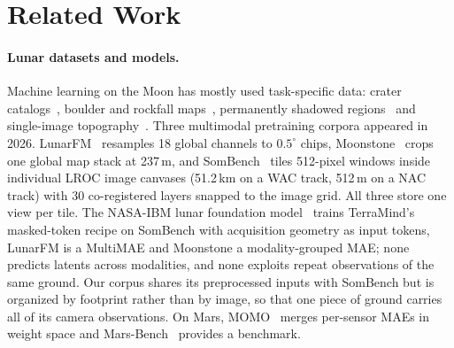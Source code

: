\section{Related Work}
\label{sec:related}

\paragraph{Lunar datasets and models.} Machine learning on the Moon has mostly used task-specific data: crater catalogs~\cite{robbins2019new,silburt2019lunar,yang2020lunar,tewari2022automated}, boulder and rockfall maps~\cite{bickel2019automated,bickel2020impacts,aussel2025global}, permanently shadowed regions~\cite{bickel2021peering} and single-image topography~\cite{chen2022cnn,sander2026moon}. Three multimodal pretraining corpora appeared in 2026. LunarFM~\cite{gironamata2026lunarfm} resamples 18 global channels to $0.5^\circ$ chips, Moonstone~\cite{prasad2026moonstone} crops one global map stack at 237\,m, and SomBench~\cite{patil2026sombench} tiles 512-pixel windows inside individual LROC image canvases (51.2\,km on a WAC track, 512\,m on a NAC track) with 30 co-registered layers snapped to the image grid. All three store one view per tile. The NASA-IBM lunar foundation model~\cite{fraccaro2026multimodal} trains TerraMind's masked-token recipe on SomBench with acquisition geometry as input tokens, LunarFM is a MultiMAE and Moonstone a modality-grouped MAE; none predicts latents across modalities, and none exploits repeat observations of the same ground. Our corpus shares its preprocessed inputs with SomBench but is organized by footprint rather than by image, so that one piece of ground carries all of its camera observations. On Mars, MOMO~\cite{purohit2026momo} merges per-sensor MAEs in weight space and Mars-Bench~\cite{purohit2025marsbench} provides a benchmark.

